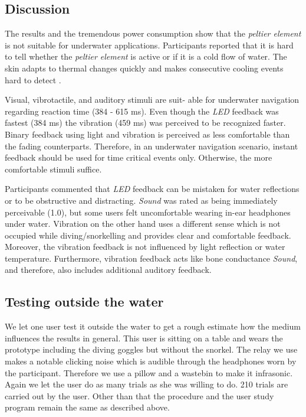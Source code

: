 \subsection{Discussion}
The results and the tremendous power consumption show that the \emph{peltier element} is not suitable for underwater applications. 
Participants reported that it is hard to tell whether the \emph{peltier element} is active or if it is a cold flow of water. 
The skin adapts to thermal changes quickly and makes consecutive cooling events hard to detect \citep{Halvey_thermalFeedback}. 

Visual, vibrotactile, and auditory stimuli are suit- able for underwater navigation regarding reaction time (384 - 615 ms). 
Even though the \emph{LED} feedback was fastest (384 ms) the vibration (459 ms) was perceived to be recognized faster. 
Binary feedback using light and vibration is perceived as less comfortable than the fading counterparts. 
Therefore, in an underwater navigation scenario, instant feedback should be used for time critical events only. 
Otherwise, the more comfortable stimuli suffice. 

Participants commented that \emph{LED} feedback can be mistaken for water reflections or to be obstructive and distracting. 
\emph{Sound} was rated as being immediately perceivable (1.0), but some users felt uncomfortable wearing in-ear headphones under water. 
Vibration on the other hand uses a different sense which is not occupied while diving/snorkelling and provides clear and comfortable feedback.
Moreover, the vibration feedback is not influenced by light reflection or water temperature.
Furthermore, vibration feedback acts like bone conductance \emph{Sound}, and therefore, also includes additional auditory feedback.

\subsection{Testing outside the water}

We let one user test it outside the water to get a rough estimate how the medium influences the results in general.
This user is sitting on a table and wears the prototype including the diving goggles but without the snorkel.
The relay we use makes a notable clicking noise which is audible through the headphones worn by the participant.
Therefore we use a pillow and a wastebin to make it infrasonic.
Again we let the user do as many trials as she was willing to do.
210 trials are carried out by the user.
Other than that the procedure and the user study program remain the same as described above.

